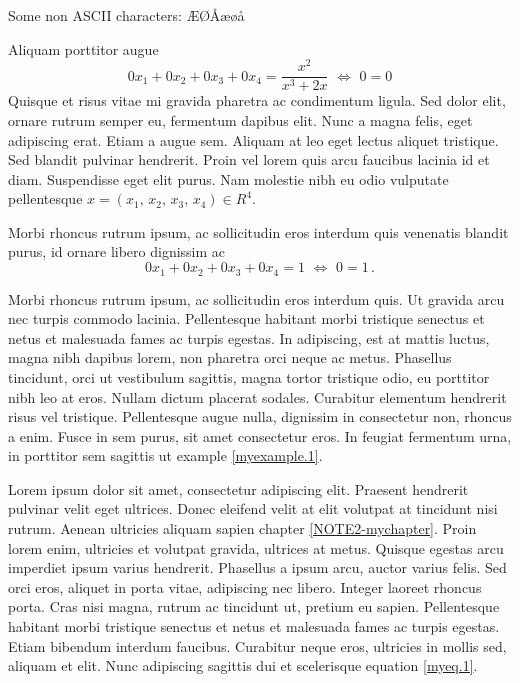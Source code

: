 Some non ASCII characters: ÆØÅæøå

\begin{example}\label{myexample.1}
Aliquam porttitor augue
\begin{equation}
0x_1+0x_2+0x_3+0x_4= \frac{x^2}{x^3+2x}\,\,\Leftrightarrow\,\,0=0
\end{equation}
Quisque et risus vitae mi gravida pharetra ac condimentum ligula. Sed dolor elit, ornare rutrum semper eu, fermentum dapibus elit. Nunc a magna felis, eget adipiscing erat. Etiam a augue sem. Aliquam at leo eget lectus aliquet tristique. Sed blandit pulvinar hendrerit. Proin vel lorem quis arcu faucibus lacinia id et diam. Suspendisse eget elit purus. Nam molestie nibh eu odio vulputate pellentesque $x=(x_1,\,x_2,\,x_3,\,x_4) \in R^4$.

Morbi rhoncus rutrum ipsum, ac sollicitudin eros interdum quis  venenatis blandit purus, id ornare libero dignissim ac
\begin{equation}
0x_1+0x_2+0x_3+0x_4=1\,\,\Leftrightarrow\,\,0=1\,.
\end{equation}
\end{example}

\begin{case}

Morbi rhoncus rutrum ipsum, ac sollicitudin eros interdum quis. Ut gravida arcu nec turpis commodo lacinia. Pellentesque habitant morbi tristique senectus et netus et malesuada fames ac turpis egestas. In adipiscing, est at mattis luctus, magna nibh dapibus lorem, non pharetra orci neque ac metus. Phasellus tincidunt, orci ut vestibulum sagittis, magna tortor tristique odio, eu porttitor nibh leo at eros. Nullam dictum placerat sodales. Curabitur elementum hendrerit risus vel tristique. Pellentesque augue nulla, dignissim in consectetur non, rhoncus a enim. Fusce in sem purus, sit amet consectetur eros. In feugiat fermentum urna, in porttitor sem sagittis ut example \ref{myexample.1}. 

Lorem ipsum dolor sit amet, consectetur adipiscing elit. Praesent hendrerit pulvinar velit eget ultrices. Donec eleifend velit at elit volutpat at tincidunt nisi rutrum. Aenean ultricies aliquam sapien chapter \ref{NOTE2-mychapter}. Proin lorem enim, ultricies et volutpat gravida, ultrices at metus. Quisque egestas arcu imperdiet ipsum varius hendrerit. Phasellus a ipsum arcu, auctor varius felis. Sed orci eros, aliquet in porta vitae, adipiscing nec libero. Integer laoreet rhoncus porta. Cras nisi magna, rutrum ac tincidunt ut, pretium eu sapien. Pellentesque habitant morbi tristique senectus et netus et malesuada fames ac turpis egestas. Etiam bibendum interdum faucibus. Curabitur neque eros, ultricies in mollis sed, aliquam et elit. Nunc adipiscing sagittis dui et scelerisque equation \ref{myeq.1}.

\end{case}

